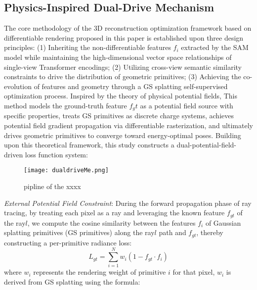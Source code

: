 \documentclass[numbers]{article}
\begin{document}
\subsection{ Physics-Inspired Dual-Drive Mechanism}

The core methodology of the 3D reconstruction optimization framework based on differentiable rendering proposed in this paper is established upon three design principles: (1) Inheriting the non-differentiable features \(f_i\) extracted by the SAM model while maintaining the high-dimensional vector space relationships of single-view Transformer encodings; (2) Utilizing cross-view semantic similarity constraints to drive the distribution of geometric primitives; (3) Achieving the co-evolution of features and geometry through a GS splatting self-supervised optimization process.
Inspired by the theory of physical potential fields, This method models the ground-truth feature \(f_gt\) as a potential field source with specific properties, treats GS primitives as discrete charge systems, achieves potential field gradient propagation via differentiable rasterization, and ultimately drives geometric primitives to converge toward energy-optimal poses.
Building upon this theoretical framework, this study constructs a dual-potential-field-driven loss function system:

\begin{figure}[htbp]
  \centering
  \texttt{[image: dualdriveMe.png]} %
  \caption{pipline of the xxxx}
  \label{fig:pipeline} %
\end{figure}

\emph{External Potential Field Constraint}: During the forward propagation phase of ray tracing, by treating each pixel as a ray and leveraging the known feature \(f_{gt}\) of the ray\(l\), we compute the cosine similarity between the features \(f_i\) of Gaussian splatting primitives (GS primitives) along the ray\(l\) path and \(f_{gt}\), thereby constructing a per-primitive radiance loss:
\begin{equation}
    L_{gt} = \sum_{i=1}^{N} w_i \left(1 - f_{gt} \cdot f_i\right)
\end{equation}
where \(w_i\) represents the rendering weight of primitive \(i\) for that pixel, \(w_i\) is derived from GS splatting using the formula:
\end{document}
